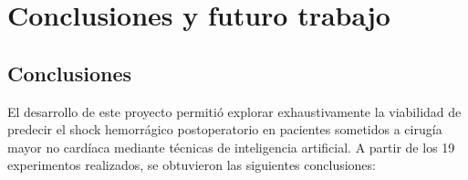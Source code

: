 \documentclass[12pt, letterpaper]{article}
\begin{document}
\newpage

\section{Conclusiones y futuro trabajo}

\subsection{Conclusiones}

El desarrollo de este proyecto permitió explorar exhaustivamente la viabilidad de predecir el shock hemorrágico postoperatorio en pacientes sometidos a cirugía mayor no cardíaca mediante técnicas de inteligencia artificial. A partir de los 19 experimentos realizados, se obtuvieron las siguientes conclusiones:
\end{document}
